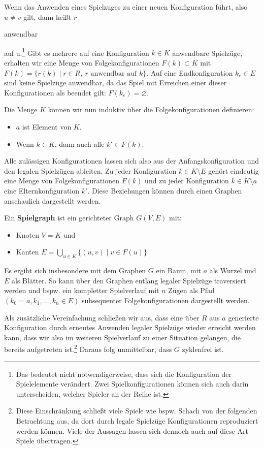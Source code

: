 \documentclass[a4paper,twoside]{scrartcl}
\let\emptyset\varnothing
\newcommand\e[1]{\begin{em}#1\end{em}}
\begin{document}
Wenn das Anwenden eines Spielzuges zu einer neuen Konfiguration führt, also $u \neq v$ gilt, dann heißt $r$ \e{anwendbar} auf u.\footnote{Das bedeutet nicht notwendigerweise, dass sich die Konfiguration der Spielelemente verändert. Zwei Spielkonfigurationen können sich auch darin unterscheiden, welcher Spieler an der Reihe ist.} Gibt es mehrere auf eine Konfiguration $k \in K$ anwendbare Spielzüge, erhalten wir eine Menge von Folgekonfigurationen $F(k) \subset K$ mit $F(k) = \{r(k) \mid r \in R,~r \textrm{ anwendbar auf } k\}$. Auf eine Endkonfiguration $k_e \in E$ sind keine Spielzüge anwendbar, da das Spiel mit Erreichen einer dieser Konfigurationen als beendet gilt: $F(k_e) = \emptyset$.

Die Menge $K$ können wir nun induktiv über die Folgekonfigurationen definieren: 

\begin{itemize}
	\item $a$ ist Element von $K$.
	\item Wenn $k \in K$, dann auch alle $k' \in F(k)$.
\end{itemize}

Alle zulässigen Konfigurationen lassen sich also aus der Anfangskonfiguration und den legalen Spielzügen ableiten. Zu jeder Konfiguration $k \in K \setminus E$ gehört eindeutig eine Menge von Folgekonfigurationen $F(k)$ und zu jeder Konfiguration $k \in K \setminus a$ eine Elternkonfiguration $k'$. Diese Beziehungen können durch einen Graphen anschaulich dargestellt werden.

Ein \textbf{Spielgraph} ist ein gerichteter Graph $G(V,E)$ mit: 

\begin{itemize}
	\item Knoten $V = K$ und
	\item Kanten $E = \bigcup\limits_{u \in K}\{(u,v) \mid v \in F(u)\}$
\end{itemize}

Es ergibt sich insbesondere mit dem Graphen $G$ ein Baum, mit $a$ als Wurzel und $E$ als Blätter. So kann über den Graphen entlang legaler Spielzüge traversiert werden und bspw. ein kompletter Spielverlauf mit $n$ Zügen als Pfad $(k_0 = a,k_1,\dots,k_n \in E)$ subsequenter Folgekonfigurationen dargestellt werden.

Als zusätzliche Vereinfachung schließen wir aus, dass eine über $R$ aus $a$ generierte Konfiguration durch erneutes Anwenden legaler Spielzüge wieder erreicht werden kann, dass wir also im weiteren Spielverlauf zu einer Situation gelangen, die bereits aufgetreten ist.\footnote{Diese Einschränkung schließt viele Spiele wie bspw. Schach von der folgenden Betrachtung aus, da dort durch legale Spielzüge Konfigurationen reproduziert werden können. Viele der Aussagen lassen sich dennoch auch auf diese Art Spiele übertragen.} Daraus folg unmittelbar, dass $G$ zyklenfrei ist.
\end{document}
